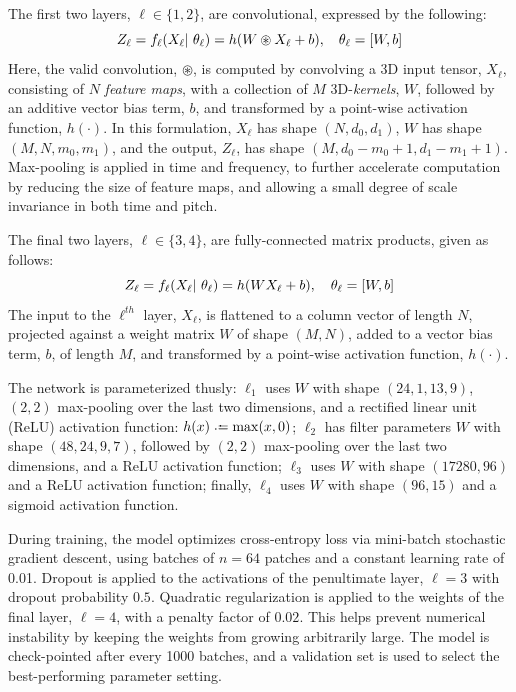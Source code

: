 \documentclass{article}
\begin{document}
The first two layers, $\ell \in \{1, 2\}$, are convolutional, expressed by the following:
\begin{equation}
\label{eq:convlayer}
\small
Z_\ell = f_\ell(X_\ell \given \theta_\ell) = h(W \circledast X_\ell + b), \quad
\theta_\ell = [W, b]
\end{equation}
Here, the valid convolution, $\circledast$, is computed by convolving a 3D input tensor,
$X_\ell$, consisting of $N$ \emph{feature maps}, with a collection of $M$ 3D-\emph{kernels}, $W$, followed by an additive vector bias term, $b$, and transformed by a point-wise activation function, $h(\cdot)$.
In this formulation, $X_\ell$ has shape $(N, d_0, d_1)$, $W$ has shape $(M, N, m_0, m_1)$,
and the output, $Z_\ell$, has shape $(M, d_0-m_0+1, d_1-m_1+1)$.
Max-pooling is applied in time and frequency, to further accelerate computation by reducing the size of feature maps, and allowing a small degree of scale invariance in both time and pitch.

The final two layers, $\ell \in \{3, 4\}$, are fully-connected matrix products, given as follows:
\begin{equation}
\label{eq:fclayer}
Z_\ell = f_\ell(X_\ell |~ \theta_\ell) = h( WX_\ell + b), \quad \theta_\ell = [W, b]
\end{equation}
The input to the $\ell^{th}$ layer, $X_\ell$, is flattened to a column vector of length $N$, projected against a weight matrix $W$ of shape $(M, N)$, added to a vector bias term, $b$, of length $M$, and transformed by a point-wise activation function, $h(\cdot)$.

The network is parameterized thusly:
$\ell_1$ uses $W$ with shape $(24, 1, 13, 9)$, $(2, 2)$ max-pooling over the last two
dimensions, and a rectified linear unit (ReLU) activation function: $h(x) \defeq \max(x, 0)$;
$\ell_2$ has filter parameters $W$ with shape $(48, 24, 9, 7)$, followed by $(2, 2)$ max-pooling over the last two dimensions, and a ReLU activation function;
$\ell_3$ uses $W$ with shape $(17280, 96)$ and a ReLU activation function;
finally, $\ell_4$ uses $W$ with shape $(96, 15)$ and a sigmoid activation function.

During training, the model optimizes cross-entropy loss via mini-batch stochastic
gradient descent, using batches of $n=64$ patches and a constant learning rate of 0.01.
Dropout is applied to the activations of the penultimate layer, $\ell=3$ with dropout
probability $0.5$.
Quadratic regularization is applied to the weights of the final layer, $\ell=4$, with a
penalty factor of $0.02$. This helps prevent numerical instability by keeping
the weights from growing arbitrarily large.
The model is check-pointed after every 1000 batches, and a validation set is used to
select the best-performing parameter setting.
\end{document}
